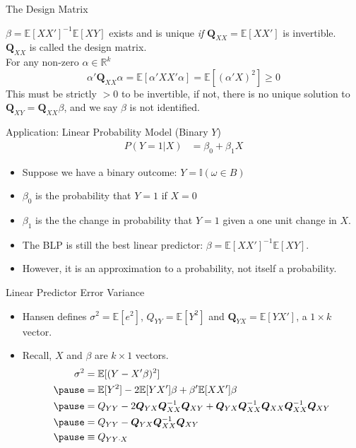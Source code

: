 \documentclass[aspectratio=169, handout, t]{beamer}
\numberwithin{equation}{section}
\begin{document}
\begin{frame}{The Design Matrix}

$\beta = \mathbb{E}[XX']^{-1}\mathbb{E}[XY]$ exists and is unique \emph{if} $\mathbf{Q}_{XX}=\mathbb{E}[XX']$ is invertible.\\
\bigskip
$\mathbf{Q}_{XX}$ is called the design matrix.\\
\bigskip
For any non-zero $\alpha \in \mathbb{R}^k$
$$\alpha'\bm{Q}_{XX}\alpha=\mathbb{E}[\alpha'XX'\alpha]=\mathbb{E}[(\alpha'X)^2] \geq 0$$
This must be strictly $>0$ to be invertible, if not, there is no unique solution to $\mathbf{Q}_{XY}=\mathbf{Q}_{XX}\beta$, and we say $\beta$ is not identified.
\end{frame}


\begin{frame}{Application: Linear Probability Model (Binary $Y$)}
\begin{align*}
P(Y=1|X)&=\beta_0+\beta_1X
\end{align*}
\begin{itemize}
\item Suppose we have a binary outcome: $Y=\mathbb{I}(\omega\in B)$
\item $\beta_0$ is the probability that $Y=1$ if $X=0$
\item $\beta_1$ is the the change in probability that $Y=1$ given a one unit change in $X$.
\item The BLP is still the best linear predictor: $\beta=\mathbb{E}[XX']^{-1}\mathbb{E}[XY]$.
\item However, it is an approximation to a probability, not itself a probability.
\end{itemize}
\end{frame}


\begin{frame}{Linear Predictor Error Variance}
\begin{itemize}
\item Hansen defines $\sigma^2=\mathbb{E}[e^2]$, $Q_{YY}=\mathbb{E}[Y^2]$ and $\mathbf{Q}_{YX}=\mathbb{E}[YX']$, a $1\times k$ vector.
\item Recall, $X$ and  $\beta$ are $k\times 1$ vectors.
\begin{align*}
\sigma^2&=\mathbb{E}[(Y-X'\beta)^2]\\ \pause
&=\mathbb{E}[Y^2]-2\mathbb{E}[YX']\beta+\beta'\mathbb{E}[XX']\beta\\\pause
&=Q_{YY}-2\bm{Q}_{YX}\bm{Q}^{-1}_{XX}\bm{Q}_{XY}+\bm{Q}_{YX}\bm{Q}^{-1}_{XX}\bm{Q}_{XX}\bm{Q}^{-1}_{XX}\bm{Q}_{XY}\\\pause
&=Q_{YY}-\bm{Q}_{YX}\bm{Q}^{-1}_{XX}\bm{Q}_{XY}\\\pause
&\equiv Q_{YY\cdot X}
\end{align*}
\end{itemize}
\end{frame}
\end{document}
